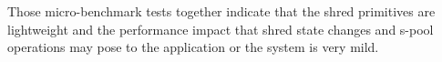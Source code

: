 Those micro-benchmark tests together indicate that the shred primitives are lightweight and the performance impact that shred state changes and s-pool operations may pose to the application or the system is very mild. 


